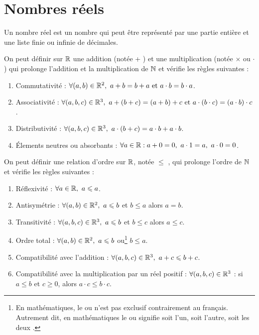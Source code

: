 \chapter{Nombres réels}\label{chap:nb_reels}

\begin{definition}
    Un nombre réel est un nombre qui peut être représenté par une partie entière et une liste finie ou infinie de décimales.
\end{definition}

\begin{proposition}
    On peut définir sur $\mathbb{R}$ une addition (notée \og + \fg) et une multiplication (notée \og $\times$ \fg ou \og $\cdot$ \fg) qui prolonge l'addition et la multiplication de $\mathbb{N}$ et vérifie les règles suivantes :
    \begin{enumerate}
        \item Commutativité : $\forall (a, b) \in \mathbb{R}^2,\ a + b = b + a \text{ et } a \cdot b = b \cdot a$.
        \item Associativité : $\forall (a, b, c) \in \mathbb{R}^3,\ a + (b + c) = (a + b) + c \text{ et } a \cdot (b \cdot c) = (a \cdot b) \cdot c$.
        \item Distributivité : $\forall (a, b, c) \in \mathbb{R}^3,\ a \cdot (b + c) = a \cdot b + a \cdot b$.
        \item \'Elements neutres ou absorbants : $\forall a \in \mathbb{R} : a + 0 = 0,\ a \cdot 1 = a,\ a \cdot 0 = 0$.
    \end{enumerate}
\end{proposition}

\begin{proposition}
    On peut définir une relation d'ordre sur $\mathbb{R}$, notée \og $\leq$ \fg, qui prolonge l'ordre de $\mathbb{N}$ et vérifie les règles suivantes :
    \begin{enumerate}
        \item Réflexivité : $\forall a \in \mathbb{R},\ a \leqslant a$.
        \item Antisymétrie : $\forall (a, b) \in \mathbb{R}^2,\ a \leqslant b$ et $b \leq a$ alors $a = b$.
        \item Transitivité : $\forall (a, b, c) \in \mathbb{R}^3,\ a \leqslant b$ et $b \leq c$ alors $a \leq c$.
        \item Ordre total : $\forall (a, b) \in \mathbb{R}^2,\ a \leqslant b$ ou\footnote{En mathématiques, le \og ou \fg n'est pas exclusif contrairement au français. Autrement dit, en mathématiques le \og ou \fg signifie \og soit l'un, soit l'autre, soit les deux \fg.} $b \leq a$.
        \item Compatibilité avec l'addition : $\forall (a, b, c) \in \mathbb{R}^3,\ a + c \leqslant b + c$.
        \item Compatibilité avec la multiplication par un réel positif : $\forall (a, b, c) \in \mathbb{R}^3$ : si $a \leq b$ et $c \geq 0$, alors $a \cdot c \leq b \cdot c$.
    \end{enumerate}
\end{proposition}

